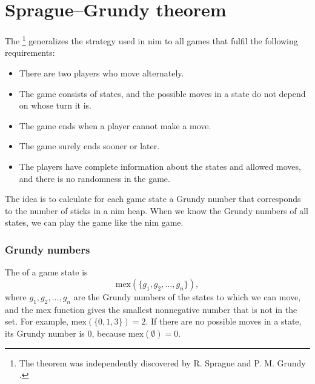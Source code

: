 \section{Sprague–Grundy theorem}


The \footnote{The theorem was
    independently discovered by R. Sprague \cite{spr35} and P. M. Grundy \cite{gru39}.} generalizes the
strategy used in nim to all games that fulfil
the following requirements:

\begin{itemize}[noitemsep]
    \item There are two players who move alternately.
    \item The game consists of states, and the possible moves
          in a state do not depend on whose turn it is.
    \item The game ends when a player cannot make a move.
    \item The game surely ends sooner or later.
    \item The players have complete information about
          the states and allowed moves, and there is no randomness in the game.
\end{itemize}
The idea is to calculate for each game state
a Grundy number that corresponds to the number of
sticks in a nim heap.
When we know the Grundy numbers of all states,
we can play the game like the nim game.

\subsubsection{Grundy numbers}


The  of a game state is
\[\textrm{mex}(\{g_1,g_2,\ldots,g_n\}),\]
where $g_1,g_2,\ldots,g_n$ are the Grundy numbers of the
states to which we can move,
and the mex function gives the smallest
nonnegative number that is not in the set.
For example, $\textrm{mex}(\{0,1,3\})=2$.
If there are no possible moves in a state,
its Grundy number is 0, because
$\textrm{mex}(\emptyset)=0$.


